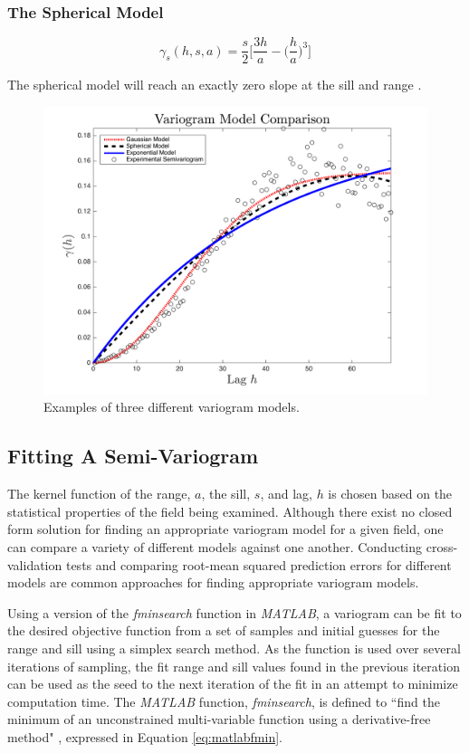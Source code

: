 \subsubsection{The Spherical Model}

\begin{equation}
	\gamma_s(h, s, a) = \frac{s}{2} \Bigg[ \dfrac{3h}{a} - \Bigg( \dfrac{h}{a} \Bigg)^3 \Bigg]
	\label{eq:sph_model}
\end{equation}

The spherical model will reach an exactly zero slope at the sill and range \cite{goov:97}.

\begin{figure}[htb!]
    \centering    
    \includegraphics[width=0.8\linewidth]{figures/fit_kern_comp.png}
    \ssp
    \caption{Examples of three different variogram models.}
    \label{fig:fit_kernel_cop}
\end{figure}

\subsection{Fitting A Semi-Variogram} \label{sec:varfit}
The kernel function of the range, $a$, the sill, $s$, and lag, $h$ is chosen based on the statistical properties of the field being examined. Although there exist no closed form solution for finding an appropriate variogram model for a given field, one can compare a variety of different models against one another. Conducting cross-validation tests and comparing root-mean squared prediction errors for different models are common approaches for finding appropriate variogram models.

Using a version of the \textit{fminsearch} function in \textit{MATLAB}, a variogram can be fit to the desired objective function from a set of samples and initial guesses for the range and sill using a simplex search method. As the function is used over several iterations of sampling, the fit range and sill values found in the previous iteration can be used as the seed to the next iteration of the fit in an attempt to minimize computation time. The \textit{MATLAB} function, \textit{fminsearch}, is defined to ``find the minimum of an unconstrained multi-variable function using a derivative-free method" \cite{mathworks:fminsearch}, expressed in Equation \ref{eq:matlabfmin}.

